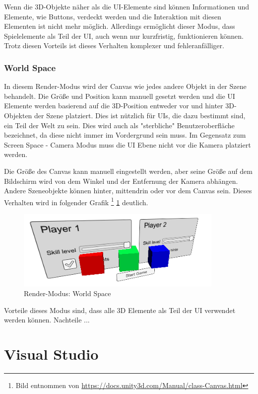 			Wenn die 3D-Objekte näher als die UI-Elemente sind können Informationen und Elemente, wie Buttons, verdeckt werden und die Interaktion mit diesen Elementen ist nicht mehr möglich. Allerdings ermöglicht dieser Modus, dass Spielelemente als Teil der UI, auch wenn nur kurzfristig, funktionieren können. Trotz diesen Vorteils ist dieses Verhalten komplexer und fehleranfälliger.

		\subsubsection{World Space}
			In diesem Render-Modus wird der Canvas wie jedes andere Objekt in der Szene behandelt. Die Größe und Position kann manuell gesetzt werden und die UI Elemente werden basierend auf die 3D-Position entweder vor und hinter 3D-Objekten der Szene platziert. Dies ist nützlich für UIs, die dazu bestimmt sind, ein Teil der Welt zu sein. Dies wird auch als "sterbliche" Benutzeroberfläche bezeichnet, da diese nicht immer im Vordergrund sein muss. Im Gegensatz zum Screen Space - Camera Modus muss die UI Ebene nicht vor die Kamera platziert werden.

			Die Größe des Canvas kann manuell eingestellt werden, aber seine Größe auf dem Bildschirm wird von dem Winkel und der Entfernung der Kamera abhängen. Andere Szeneobjekte können hinter, mittendrin oder vor dem Canvas sein. Dieses Verhalten wird in folgender Grafik \footnote{Bild entnommen von \url{https://docs.unity3d.com/Manual/class-Canvas.html}} \ref{renderWorldSpace} deutlich.

			\begin{figure}[htbp]
				\centering 
				\label{renderWorldSpace}
				\includegraphics[width=10cm]{pics/CanvasWorldSpace.png}
				\caption{Render-Modus: World Space}
			\end{figure}

			Vorteile dieses Modus sind, dass alle 3D Elemente als Teil der UI verwendet werden können. Nachteile ...
			
\section{Visual Studio}

